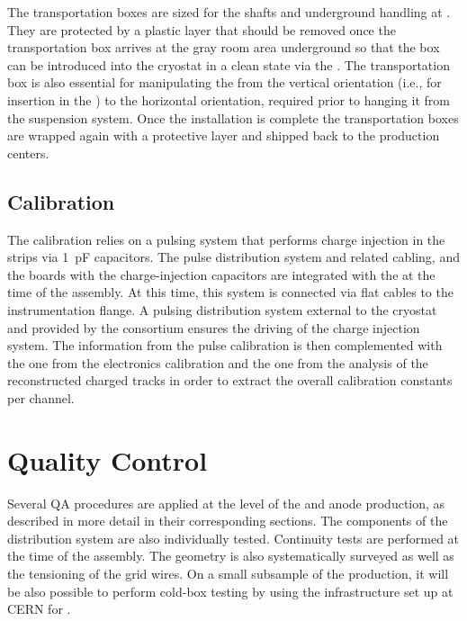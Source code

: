 The transportation boxes are sized for the shafts and underground handling at \surf{}.
They are protected by a plastic layer that should be removed once the transportation box arrives at the gray room area 
underground so that the box can be introduced into the cryostat in a clean state via the . The transportation box is also essential for manipulating the  from the vertical orientation (i.e., for insertion in the ) to the horizontal orientation, required %
 prior to hanging it from the suspension system. Once the installation is complete the transportation boxes are wrapped again with a protective layer and shipped back to the production centers. 

\subsection{Calibration}
\label{sec:fddp-crp-install-calib}

The  calibration relies on a pulsing system that performs charge injection in the strips via \SI{1}{pF} capacitors. The pulse distribution system and related cabling, and the boards with the charge-injection capacitors are integrated  with the  at the time of the  assembly. At this time, this system is connected via flat cables to the instrumentation flange. A pulsing distribution system external to the cryostat and  provided by the  consortium ensures the driving of the charge injection system. 
 The information from the pulse calibration is then complemented 
 with the one from the  electronics calibration and the one from the analysis of the reconstructed charged tracks in order to extract the overall calibration constants per channel.

\section{Quality Control}
\label{sec:fddp-crp-qc}

Several QA 
procedures are applied at the level of the  and anode production, as described in more detail in their corresponding sections. The components of the  distribution system are also individually tested. Continuity tests are performed at the time of the  assembly. The  geometry is also systematically surveyed as well as the tensioning of the grid wires. On a small subsample of the  production, it will be also possible to perform cold-box testing by using the infrastructure set up at CERN for .


